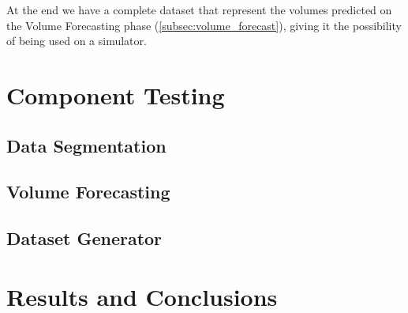 At the end we have a complete dataset that represent the volumes predicted on
the Volume Forecasting phase (\ref{subsec:volume_forecast}), giving it the
possibility of being used on a simulator.

\section{Component Testing}

\subsection{Data Segmentation}

\subsection{Volume Forecasting}

\subsection{Dataset Generator}


\section{Results and Conclusions}

